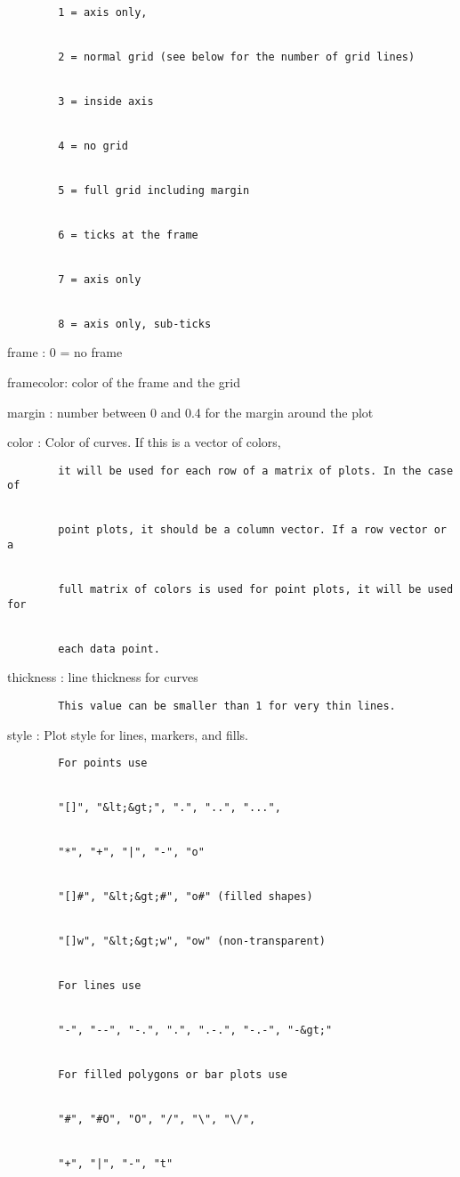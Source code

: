 \documentclass[
]{book}
\begin{document}
\begin{verbatim}
        1 = axis only,


        2 = normal grid (see below for the number of grid lines)


        3 = inside axis


        4 = no grid


        5 = full grid including margin


        6 = ticks at the frame


        7 = axis only


        8 = axis only, sub-ticks
\end{verbatim}

frame : 0 = no frame

framecolor: color of the frame and the grid

margin : number between 0 and 0.4 for the margin around the plot

color : Color of curves. If this is a vector of colors,

\begin{verbatim}
        it will be used for each row of a matrix of plots. In the case of


        point plots, it should be a column vector. If a row vector or a


        full matrix of colors is used for point plots, it will be used for


        each data point.
\end{verbatim}

thickness : line thickness for curves

\begin{verbatim}
        This value can be smaller than 1 for very thin lines.
\end{verbatim}

style : Plot style for lines, markers, and fills.

\begin{verbatim}
        For points use


        "[]", "&lt;&gt;", ".", "..", "...",


        "*", "+", "|", "-", "o"


        "[]#", "&lt;&gt;#", "o#" (filled shapes)


        "[]w", "&lt;&gt;w", "ow" (non-transparent)


        For lines use


        "-", "--", "-.", ".", ".-.", "-.-", "-&gt;"


        For filled polygons or bar plots use


        "#", "#O", "O", "/", "\", "\/",


        "+", "|", "-", "t"
\end{verbatim}
\end{document}
